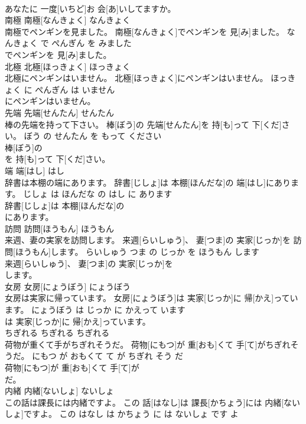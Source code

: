 \documentclass[8pt]{extreport}
\begin{document}
\begin{CJK}{UTF8}{min}
\\	あなたに 一度[いちど]お 会[あ]いしてますか。			
\\	南極	南極[なんきょく]	なんきょく	
\\	南極でペンギンを見ました。	南極[なんきょく]でペンギンを 見[み]ました。	なんきょく で ぺんぎん を みました	
\\	でペンギンを 見[み]ました。			
\\	北極	北極[ほっきょく]	ほっきょく	
\\	北極にペンギンはいません。	北極[ほっきょく]にペンギンはいません。	ほっきょく に ぺんぎん は いません	
\\	にペンギンはいません。			
\\	先端	先端[せんたん]	せんたん	
\\	棒の先端を持って下さい。	棒[ぼう]の 先端[せんたん]を 持[も]って 下[くだ]さい。	ぼう の せんたん を もって ください	
\\	棒[ぼう]の
\\	を 持[も]って 下[くだ]さい。			
\\	端	端[はし]	はし	
\\	辞書は本棚の端にあります。	辞書[じしょ]は 本棚[ほんだな]の 端[はし]にあります。	じしょ は ほんだな の はし に あります	
\\	辞書[じしょ]は 本棚[ほんだな]の
\\	にあります。			
\\	訪問	訪問[ほうもん]	ほうもん	
\\	来週、妻の実家を訪問します。	来週[らいしゅう]、 妻[つま]の 実家[じっか]を 訪問[ほうもん]します。	らいしゅう つま の じっか を ほうもん します	
\\	来週[らいしゅう]、 妻[つま]の 実家[じっか]を
\\	します。			
\\	女房	女房[にょうぼう]	にょうぼう	
\\	女房は実家に帰っています。	女房[にょうぼう]は 実家[じっか]に 帰[かえ]っています。	にょうぼう は じっか に かえって います	
\\	は 実家[じっか]に 帰[かえ]っています。			
\\	ちぎれる	ちぎれる	ちぎれる	
\\	荷物が重くて手がちぎれそうだ。	荷物[にもつ]が 重[おも]くて 手[て]がちぎれそうだ。	にもつ が おもくて て が ちぎれ そう だ	
\\	荷物[にもつ]が 重[おも]くて 手[て]が
\\	だ。			
\\	内緒	内緒[ないしょ]	ないしょ	
\\	この話は課長には内緒ですよ。	この 話[はなし]は 課長[かちょう]には 内緒[ないしょ]ですよ。	この はなし は かちょう に は ないしょ です よ	

\end{CJK}
\end{document}
